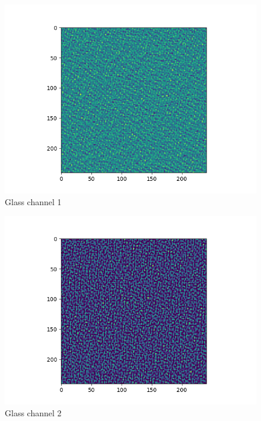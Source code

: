 \documentclass[12pt,reqno]{amsart}
\numberwithin{equation}{section}
\begin{document}
\begin{enumerate}
\begin{figure}[H]
\centering
\includegraphics[scale=0.6]{glass_channel_1}
\caption{Glass channel 1}
\end{figure}

\begin{figure}[H]
\centering
\includegraphics[scale=0.6]{glass_channel_2}
\caption{Glass channel 2}
\end{figure}


\end{enumerate}
\end{document}
